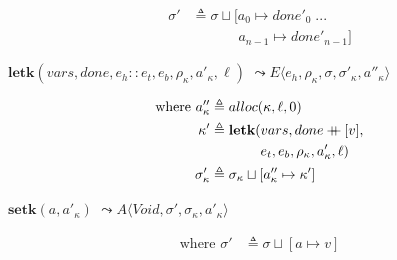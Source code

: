 \documentclass[12pt,draft]{article}
\newcommand\mdoubleplus{\ensuremath{\mathbin{+\mkern-9mu+}}}
\begin{document}
\begin{multicols*}{2}
\begin{align*}
  \sigma' &\triangleq \sigma \sqcup [a_0 \mapsto done'_0\;...\\
                    &\;\;\;\;\;\;\;\;\;\;\;\;a_{n-1} \mapsto done'_{n-1}]
\end{align*}
\begin{center}
  $\textbf{letk}(vars, done, e_h::e_t , e_b , \rho_\kappa, a'_\kappa, \ell)$
  $\leadsto E\langle e_h , \rho_\kappa , \sigma , \sigma'_\kappa , a''_\kappa \rangle$
\end{center}
\vspace{-7mm}
\begin{align*}
  \text{where }
  a''_\kappa &\triangleq alloc(\kappa, \ell, 0) \\
  \kappa' &\triangleq \textbf{letk}(vars, done \mdoubleplus [v], \\
             &\;\;\;\;\;\;\;\;\;\;\;\;\;e_t, e_b, \rho_\kappa, a'_\kappa, \ell) \\
  \sigma'_\kappa &\triangleq \sigma_\kappa \sqcup [a''_\kappa \mapsto \kappa']
\end{align*}
\begin{center}
  $\textbf{setk}(a, a'_\kappa)$
  $\leadsto A\langle \textit{Void} , \sigma' , \sigma_\kappa , a'_\kappa \rangle$
\end{center}
\vspace{-7mm}
\begin{align*}
  \text{where } \sigma' &\triangleq \sigma \sqcup [a \mapsto v]
\end{align*}

\vfill\null
\columnbreak



\end{multicols*}
\end{document}
